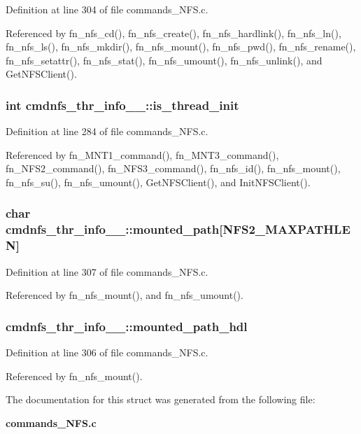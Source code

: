 Definition at line 304 of file commands\_\-NFS.c.

Referenced by fn\_\-nfs\_\-cd(), fn\_\-nfs\_\-create(), fn\_\-nfs\_\-hardlink(), fn\_\-nfs\_\-ln(), fn\_\-nfs\_\-ls(), fn\_\-nfs\_\-mkdir(), fn\_\-nfs\_\-mount(), fn\_\-nfs\_\-pwd(), fn\_\-nfs\_\-rename(), fn\_\-nfs\_\-setattr(), fn\_\-nfs\_\-stat(), fn\_\-nfs\_\-umount(), fn\_\-nfs\_\-unlink(), and Get\-NFSClient().
\subsubsection{\setlength{\rightskip}{0pt plus 5cm}int {\bf cmdnfs\_\-thr\_\-info\_\-\_\-::is\_\-thread\_\-init}}\label{structcmdnfs__thr__info_____o0}




Definition at line 284 of file commands\_\-NFS.c.

Referenced by fn\_\-MNT1\_\-command(), fn\_\-MNT3\_\-command(), fn\_\-NFS2\_\-command(), fn\_\-NFS3\_\-command(), fn\_\-nfs\_\-id(), fn\_\-nfs\_\-mount(), fn\_\-nfs\_\-su(), fn\_\-nfs\_\-umount(), Get\-NFSClient(), and Init\-NFSClient().
\subsubsection{\setlength{\rightskip}{0pt plus 5cm}char {\bf cmdnfs\_\-thr\_\-info\_\-\_\-::mounted\_\-path}[NFS2\_\-MAXPATHLEN]}\label{structcmdnfs__thr__info_____o8}




Definition at line 307 of file commands\_\-NFS.c.

Referenced by fn\_\-nfs\_\-mount(), and fn\_\-nfs\_\-umount().
\subsubsection{ {\bf cmdnfs\_\-thr\_\-info\_\-\_\-::mounted\_\-path\_\-hdl}}\label{structcmdnfs__thr__info_____o7}




Definition at line 306 of file commands\_\-NFS.c.

Referenced by fn\_\-nfs\_\-mount().

The documentation for this struct was generated from the following file:\begin{CompactItemize}
\item 
{\bf commands\_\-NFS.c}\end{CompactItemize}
